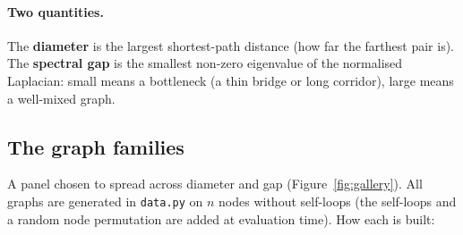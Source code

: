 \documentclass[11pt,a4paper]{article}
\begin{document}
\paragraph{Two quantities.} The \textbf{diameter} is the largest shortest-path distance
(how far the farthest pair is). The \textbf{spectral gap} is the smallest non-zero
eigenvalue of the normalised Laplacian: small means a bottleneck (a thin bridge or long
corridor), large means a well-mixed graph.

\subsection{The graph families}
\label{sec:families}

A panel chosen to spread across diameter and gap (Figure~\ref{fig:gallery}). All graphs are
generated in \texttt{data.py} on $n$ nodes without self-loops (the self-loops and a random
node permutation are added at evaluation time). How each is built:
\end{document}
